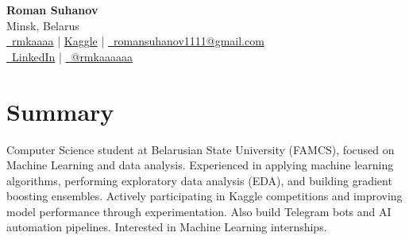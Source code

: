 \documentclass[a4paper,11pt]{article}
\begin{document}
\begin{center}
    {\LARGE \textbf{Roman Suhanov}} \\[6pt]
    Minsk, Belarus \\[4pt]
    \href{https://github.com/rmkaaaa}{\faGithub\ rmkaaaa}
    \quad | \quad
    \href{https://www.kaggle.com/rmkaaaa}{Kaggle}
    \quad | \quad
    \href{mailto:romansuhanov1111@gmail.com}{\faEnvelope\ romansuhanov1111@gmail.com}
    \\[4pt]
    \href{https://www.linkedin.com/in/роман-суханов-0486473ba/}{\faLinkedin\ LinkedIn}
    \quad | \quad
    \href{https://t.me/rmkaaaaaa}{\faTelegram\ @rmkaaaaaa}
\end{center}
\section{Summary}
Computer Science student at Belarusian State University (FAMCS), focused on Machine Learning and data analysis. 
Experienced in applying machine learning algorithms, performing exploratory data analysis (EDA), and building gradient boosting 
ensembles. Actively participating in Kaggle competitions and improving model performance through experimentation. 
Also build Telegram bots and AI automation pipelines. Interested in Machine Learning internships.
\end{document}
